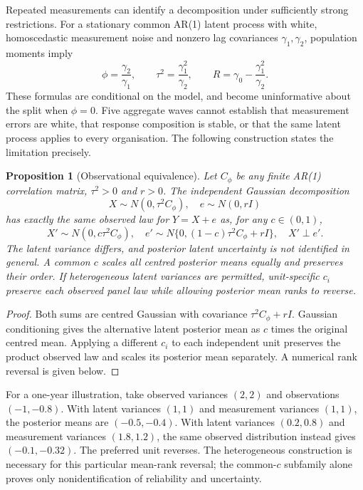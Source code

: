 \documentclass[11pt,letterpaper]{article}
\newtheorem{proposition}{Proposition}
\begin{document}
Repeated measurements can identify a decomposition under sufficiently strong restrictions. For a stationary common AR(1) latent process with white, homoscedastic measurement noise and nonzero lag covariances $\gamma_1,\gamma_2$, population moments imply
\begin{equation}
 \phi=\frac{\gamma_2}{\gamma_1},\qquad
 \tau^2=\frac{\gamma_1^2}{\gamma_2},\qquad
 R=\gamma_0-\frac{\gamma_1^2}{\gamma_2}.
 \label{eq:identifiable_restriction}
\end{equation}
These formulas are conditional on the model, and become uninformative about the split when $\phi=0$. Five aggregate waves cannot establish that measurement errors are white, that response composition is stable, or that the same latent process applies to every organisation. The following construction states the limitation precisely.

\begin{proposition}[Observational equivalence]\label{prop:nonid}
Let $C_\phi$ be any finite AR(1) correlation matrix, $\tau^2>0$ and $r>0$. The independent Gaussian decomposition
\[
 X\sim N(0,\tau^2C_\phi),\quad e\sim N(0,rI)
\]
has exactly the same observed law for $Y=X+e$ as, for any $c\in(0,1)$,
\[
 X'\sim N(0,c\tau^2C_\phi),\quad
 e'\sim N\{0,(1-c)\tau^2C_\phi+rI\},\quad X'\perp e'.
\]
The latent variance differs, and posterior latent uncertainty is not identified in general. A common $c$ scales all centred posterior means equally and preserves their order. If heterogeneous latent variances are permitted, unit-specific $c_i$ preserve each observed panel law while allowing posterior mean ranks to reverse.
\end{proposition}
\begin{proof}
Both sums are centred Gaussian with covariance $\tau^2C_\phi+rI$. Gaussian conditioning gives the alternative latent posterior mean as $c$ times the original centred mean. Applying a different $c_i$ to each independent unit preserves the product observed law and scales its posterior mean separately. A numerical rank reversal is given below.
\end{proof}

For a one-year illustration, take observed variances $(2,2)$ and observations $(-1,-0.8)$. With latent variances $(1,1)$ and measurement variances $(1,1)$, the posterior means are $(-0.5,-0.4)$. With latent variances $(0.2,0.8)$ and measurement variances $(1.8,1.2)$, the same observed distribution instead gives $(-0.1,-0.32)$. The preferred unit reverses. The heterogeneous construction is necessary for this particular mean-rank reversal; the common-$c$ subfamily alone proves only nonidentification of reliability and uncertainty.
\end{document}

